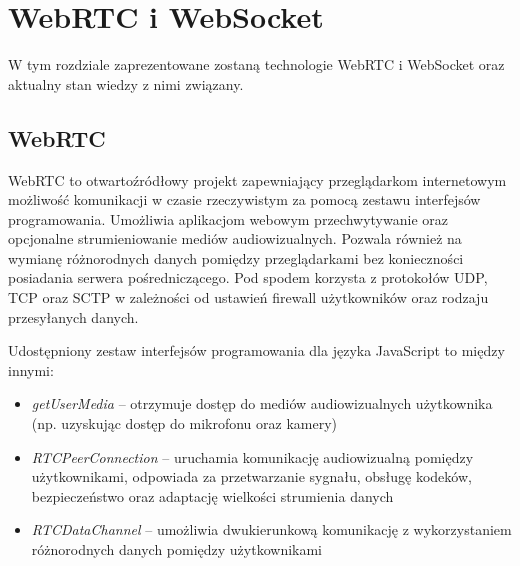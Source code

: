 \documentclass[language=polish,type=master]{aghmodern}
\begin{document}
\chapter{WebRTC i WebSocket}
W tym rozdziale zaprezentowane zostaną technologie WebRTC i WebSocket oraz aktualny stan wiedzy z nimi związany.

\section{WebRTC}
WebRTC to otwartoźródłowy projekt zapewniający przeglądarkom internetowym możliwość komunikacji w czasie rzeczywistym za pomocą zestawu interfejsów programowania.
Umożliwia aplikacjom webowym przechwytywanie oraz opcjonalne strumieniowanie mediów audiowizualnych.
Pozwala również na wymianę różnorodnych danych pomiędzy przeglądarkami bez konieczności posiadania serwera pośredniczącego.
Pod spodem korzysta z protokołów UDP, TCP oraz SCTP w zależności od ustawień firewall użytkowników oraz rodzaju przesyłanych danych.

Udostępniony zestaw interfejsów programowania dla języka JavaScript to między innymi:

\begin{itemize}
    \item \emph{getUserMedia} -- otrzymuje dostęp do mediów audiowizualnych użytkownika (np. uzyskując dostęp do mikrofonu oraz kamery)
    \item \emph{RTCPeerConnection} -- uruchamia komunikację audiowizualną pomiędzy użytkownikami, odpowiada za przetwarzanie sygnału, obsługę kodeków, bezpieczeństwo oraz adaptację wielkości strumienia danych
    \item \emph{RTCDataChannel} -- umożliwia dwukierunkową komunikację z wykorzystaniem różnorodnych danych pomiędzy użytkownikami
\end{itemize}
\end{document}

